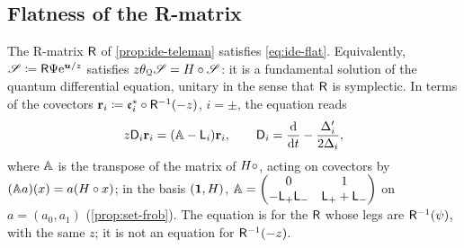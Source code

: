 \subsection{Flatness of the R-matrix}

\begin{prop}[Flatness of $\Rm$]
\label{prop:ide-flat}
The R-matrix $\Rm$ of \cref{prop:ide-teleman} satisfies \cref{eq:ide-flat}. Equivalently, $\mathscr{S}\coloneqq\mathsf{R}\Psi\mathrm{e}^{\boldsymbol{u}/z}$ satisfies $z\theta_{\mathcal{Q}}\mathscr{S}=H\circ\mathscr{S}$: it is a fundamental solution of the quantum differential equation, unitary in the sense that $\Rm$ is symplectic. In terms of the covectors $\mathbf{r}_i\coloneqq\mathfrak{e}_i^*\circ\mathsf{R}^{-1}(-z)$, $i=\pm$, the equation reads
\begin{equation}
\label{eq:ide-roweq}
z\mathsf{D}_i\mathbf{r}_i=(\mathbb{A}-\mathsf{L}_i)\mathbf{r}_i,\qquad \mathsf{D}_i=\frac{\mathrm{d}}{\mathrm{d} t}-\frac{\Delta_i'}{2\Delta_i},
\end{equation}
where $\mathbb{A}$ is the transpose of the matrix of $H\circ$, acting on covectors by $(\mathbb{A} a)(x)=a(H\circ x)$; in the basis $(\mathbf{1},H)$, $\mathbb{A}=\begin{pmatrix}0&1\\-\mathsf{L}_+\mathsf{L}_-&\mathsf{L}_++\mathsf{L}_-\end{pmatrix}$ on $a=(a_0,a_1)$ (\cref{prop:set-frob}). The equation is for the $\Rm$ whose legs are $\mathsf{R}^{-1}(\psi)$, with the same $z$; it is not an equation for $\mathsf{R}^{-1}(-z)$.
\end{prop}

